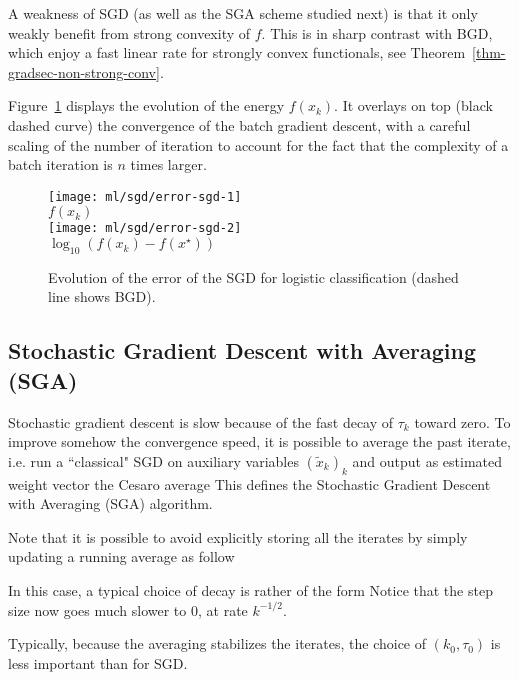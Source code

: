 A weakness of SGD (as well as the SGA scheme studied next) is that it only weakly benefit from strong convexity of $f$. This is in sharp contrast with BGD, which enjoy a fast linear rate for strongly convex functionals, see Theorem~\ref{thm-gradsec-non-strong-conv}.

Figure~\ref{fig-sgd} displays the evolution of the energy $f(x_k)$. 
It overlays on top (black dashed curve) the convergence of the batch gradient descent, with a careful scaling of the 
number of iteration to account for the fact that the complexity of a batch iteration is $n$ times larger. 


\begin{figure}
\centering
\texttt{[image: ml/sgd/error-sgd-1]} \\
$f(x_k)$ \\
\texttt{[image: ml/sgd/error-sgd-2]} \\
$\log_{10}(f(x_k)-f(x^\star))$ 
\caption{\label{fig-sgd}
Evolution of the error of the SGD for logistic classification (dashed line shows BGD).
}
\end{figure}




\subsection{Stochastic Gradient Descent with Averaging (SGA)}
\label{sec-sga}

Stochastic gradient descent is slow because of the fast decay of
$\tau_k$ toward zero.
%
To improve somehow the convergence speed, it is possible to average the past
iterate, i.e. run a ``classical" SGD on auxiliary variables $( \tilde x_k)_k$
and output as estimated weight vector the Cesaro average
This defines the Stochastic Gradient Descent with Averaging (SGA)
algorithm.

Note that it is possible to avoid explicitly storing all the iterates by simply
updating a running average as follow


In this case, a typical choice of decay is rather of the form 
Notice that the step size now goes much slower to 0, at rate $k^{-1/2}$.


Typically, because the averaging stabilizes the iterates, the choice of
$(k_0,\tau_0)$ is less important than for SGD. 

